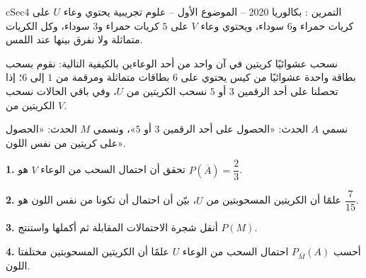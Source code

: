\documentclass[12pt,a4paper]{article}
\newenvironment{BOX}[2]{\begin{otherlanguage}{english}\begin{arbox}{#1}{#2}}{\end{arbox}\end{otherlanguage}}
\newcounter{exo}
\newenvironment{tamrin}[1]{\stepcounter{exo}\begin{BOX}{cSec}{التمرين \theexo: #1}}{\end{BOX}}
\newenvironment{LTR}{\begin{otherlanguage}{english}}{\end{otherlanguage}}
\renewcommand{\ldots}{\mathinner{\ldotp\ldotp\ldotp}}
\newcommand{\QQ}[1]{\par\smallskip\textbf{#1.} }
\begin{document}
\begin{tamrin}{بكالوريا 2020 -- الموضوع الأول -- علوم تجريبية}
يحتوي وعاء $U$ على $4$ كريات حمراء و$6$ سوداء، ويحتوي وعاء $V$ على $5$ كريات حمراء و$3$ سوداء، وكل الكريات متماثلة ولا نفرق بينها عند اللمس.

نسحب عشوائيًا كريتين في آن واحد من أحد الوعاءين بالكيفية التالية: نقوم بسحب بطاقة واحدة عشوائيًا من كيس يحتوي على $6$ بطاقات متماثلة ومرقمة من $1$ إلى $6$؛ إذا تحصلنا على أحد الرقمين $3$ أو $5$ نسحب الكريتين من $U$، وفي باقي الحالات نسحب الكريتين من $V$.

نسمي $A$ الحدث: «الحصول على أحد الرقمين $3$ أو $5$»، ونسمي $M$ الحدث: «الحصول على كريتين من نفس اللون».
\begin{center}\begin{LTR}\end{LTR}\end{center}
\QQ{1} تحقق أن احتمال السحب من الوعاء $V$ هو $P(\overline{A})=\dfrac23$.
\QQ{2} علمًا أن الكريتين المسحوبتين من $U$، بيّن أن احتمال أن تكونا من نفس اللون هو $\dfrac{7}{15}$.
\QQ{3} أنقل شجرة الاحتمالات المقابلة ثم أكملها واستنتج $P(M)$.
\QQ{4} أحسب $P_{\overline{M}}(A)$ احتمال السحب من الوعاء $U$ علمًا أن الكريتين المسحوبتين مختلفتا اللون.
\end{tamrin}
\end{document}
